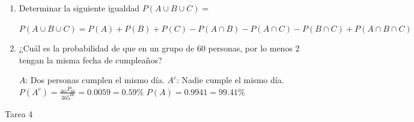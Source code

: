 \documentclass[a4paper, 12pt]{article}
\newcommand{\Pspace}{0.5cm}
\newcommand{\Aspace}{0.2cm}
\begin{document}
\begin{enumerate}
    \vspace{\Pspace}
    \item Determinar la siguiente igualdad $P(A \cup B \cup C) =$
    \vspace{\Aspace} \par
    { \color{azul} $P(A \cup B \cup C) = P(A) + P(B) + P(C) - P(A \cap B) - P(A \cap C) - P(B \cap C) + P(A \cap B \cap C)$ }


    \vspace{\Pspace}
    \item ¿Cuál es la probabilidad de que en un grupo de 60 personas, por lo menos 2 tengan la misma fecha de cumpleaños?
    \vspace{\Aspace} \par
    { \color{azul} 
        $A$: Dos personas cumplen el mismo día.
        \newline $A^{c}$: Nadie cumple el mismo día.
        \newline $P(A^{c}) = \frac{_{365}P_{60}}{365^{60}} = 0{.}0059 = 0{.}59\%$
        \newline $P(A) = 0{.}9941 = 99{.}41\%$
    } 
\end{enumerate}



\newpage
\begin{center}
    { \LARGE Tarea 4}
\end{center}
\end{document}
